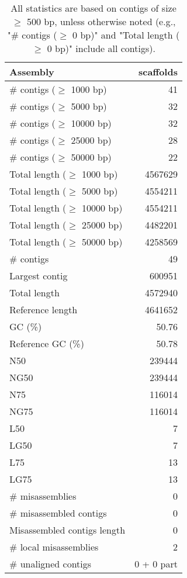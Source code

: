 \documentclass[12pt,a4paper]{article}
\begin{document}
\begin{table}[ht]
\begin{center}
\caption{All statistics are based on contigs of size $\geq$ 500 bp, unless otherwise noted (e.g., "\# contigs ($\geq$ 0 bp)" and "Total length ($\geq$ 0 bp)" include all contigs).}
\begin{tabular}{|l*{1}{|r}|}
\hline
Assembly & scaffolds \\ \hline
\# contigs ($\geq$ 1000 bp) & 41 \\ \hline
\# contigs ($\geq$ 5000 bp) & 32 \\ \hline
\# contigs ($\geq$ 10000 bp) & 32 \\ \hline
\# contigs ($\geq$ 25000 bp) & 28 \\ \hline
\# contigs ($\geq$ 50000 bp) & 22 \\ \hline
Total length ($\geq$ 1000 bp) & 4567629 \\ \hline
Total length ($\geq$ 5000 bp) & 4554211 \\ \hline
Total length ($\geq$ 10000 bp) & 4554211 \\ \hline
Total length ($\geq$ 25000 bp) & 4482201 \\ \hline
Total length ($\geq$ 50000 bp) & 4258569 \\ \hline
\# contigs & 49 \\ \hline
Largest contig & 600951 \\ \hline
Total length & 4572940 \\ \hline
Reference length & 4641652 \\ \hline
GC (\%) & 50.76 \\ \hline
Reference GC (\%) & 50.78 \\ \hline
N50 & 239444 \\ \hline
NG50 & 239444 \\ \hline
N75 & 116014 \\ \hline
NG75 & 116014 \\ \hline
L50 & 7 \\ \hline
LG50 & 7 \\ \hline
L75 & 13 \\ \hline
LG75 & 13 \\ \hline
\# misassemblies & 0 \\ \hline
\# misassembled contigs & 0 \\ \hline
Misassembled contigs length & 0 \\ \hline
\# local misassemblies & 2 \\ \hline
\# unaligned contigs & 0 + 0 part \\ \hline

\end{tabular}
\end{center}
\end{table}
\end{document}
